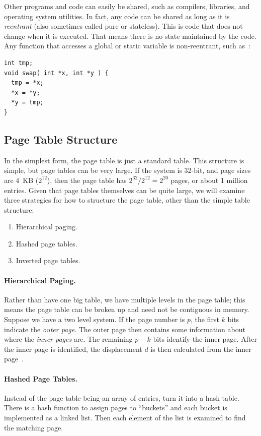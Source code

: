 Other programs and code can easily be shared, such as compilers, libraries, and operating system utilities. In fact, any code can be shared as long as it is \textit{reentrant} (also sometimes called pure or stateless). This is code that does not change when it is executed. That means there is no state maintained by the code. Any function that accesses a global or static variable is non-reentrant, such as~\cite{mte241}:

\begin{verbatim}
int tmp;
void swap( int *x, int *y ) {
  tmp = *x;
  *x = *y;
  *y = tmp; 
}
\end{verbatim}

\subsection*{Page Table Structure}
In the simplest form, the page table is just a standard table. This structure is simple, but page tables can be very large. If the system is 32-bit, and page sizes are 4~KB ($2^{12}$), then the page table has $2^{32}/2^{12} = 2^{20}$ pages, or about 1 million entries. Given that page tables themselves can be quite large, we will examine three strategies for how to structure the page table, other than the simple table structure:

\begin{enumerate}
	\item Hierarchical paging.
	\item Hashed page tables.
	\item Inverted page tables.
\end{enumerate}

\paragraph{Hierarchical Paging.}
Rather than have one big table, we have multiple levels in the page table; this means the page table can be broken up and need not be contiguous in memory. Suppose we have a two level system. If the page number is $p$, the first $k$ bits indicate the \textit{outer page}. The outer page then contains some information about where the \textit{inner pages} are. The remaining $p-k$ bits identify the inner page. After the inner page is identified, the displacement $d$ is then calculated from the inner page~\cite{osc}.

\paragraph{Hashed Page Tables.} 
Instead of the page table being an array of entries, turn it into a hash table. There is a hash function to assign pages to ``buckets'' and each bucket is implemented as a linked list. Then each element of the list is examined to find the matching page.

